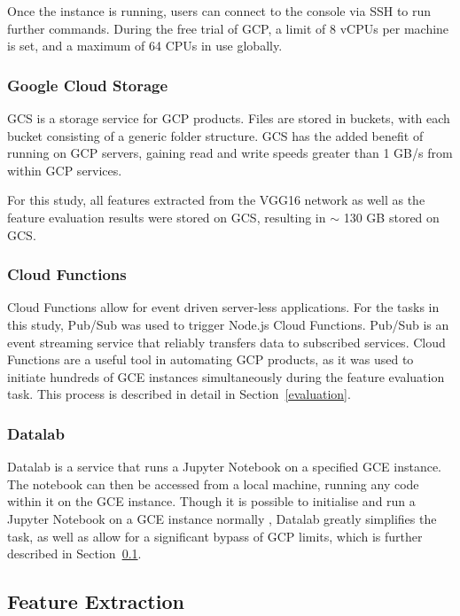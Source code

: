 Once the instance is running, users can connect to the console via SSH to run further commands.
During the free trial of GCP, a limit of 8 vCPUs per machine is set, and a maximum of 64 CPUs in use globally.

\subsubsection{Google Cloud Storage}

GCS is a storage service for GCP products.
Files are stored in buckets, with each bucket consisting of a generic folder structure.
GCS has the added benefit of running on GCP servers, gaining read and write speeds greater than 1 GB/s from within GCP services.

For this study, all features extracted from the VGG16 network as well as the feature evaluation results were stored on GCS, resulting in $\sim$ 130 GB stored on GCS.

\subsubsection{Cloud Functions}

Cloud Functions allow for event driven server-less applications.
For the tasks in this study, Pub/Sub was used to trigger Node.js Cloud Functions.
Pub/Sub is an event streaming service that reliably transfers data to subscribed services.
Cloud Functions are a useful tool in automating GCP products, as it was used to initiate hundreds of GCE instances simultaneously during the feature evaluation task.
This process is described in detail in Section~\ref{evaluation}.

\subsubsection{Datalab}

Datalab is a service that runs a Jupyter Notebook on a specified GCE instance.
The notebook can then be accessed from a local machine, running any code within it on the GCE instance.
Though it is possible to initialise and run a Jupyter Notebook on a GCE instance normally \cite{gce}, Datalab greatly simplifies the task, as well as allow for a significant bypass of GCP limits, which is further described in Section~\ref{extraction}.

\subsection{Feature Extraction} \label{extraction}

